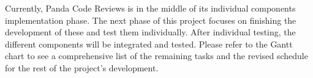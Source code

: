 
Currently, Panda Code Reviews is in the middle of its individual components
implementation phase. The next phase of this project focuses on finishing the
development of these and test them individually. After individual testing, the
different components will be integrated and tested. Please refer to the Gantt
chart to see a comprehensive list of the remaining tasks and the revised
schedule for the rest of the project's development.
